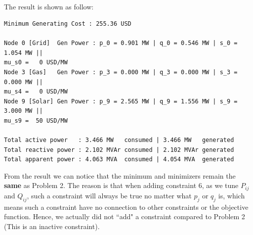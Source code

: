 \documentclass[12pt]{article}
\begin{document}
\subsection{}
The result is shown as follow:
\begin{verbatim}
Minimum Generating Cost : 255.36 USD

Node 0 [Grid]  Gen Power : p_0 = 0.901 MW | q_0 = 0.546 MW | s_0 = 1.054 MW || 
mu_s0 =   0 USD/MW
Node 3 [Gas]   Gen Power : p_3 = 0.000 MW | q_3 = 0.000 MW | s_3 = 0.000 MW || 
mu_s4 =   0 USD/MW
Node 9 [Solar] Gen Power : p_9 = 2.565 MW | q_9 = 1.556 MW | s_9 = 3.000 MW || 
mu_s9 =  50 USD/MW

Total active power   : 3.466 MW   consumed | 3.466 MW   generated
Total reactive power : 2.102 MVAr consumed | 2.102 MVAr generated
Total apparent power : 4.063 MVA  consumed | 4.054 MVA  generated
\end{verbatim}
\newpage
\noindent From the result we can notice that the minimum and minimizers remain the \textbf{same} as Problem 2. The reason is that when adding constraint 6, as we tune $P_{ij}$ and $Q_{ij}$, such a constraint will always be true no matter what $p_j$ or $q_j$ is, which means such a constraint have no connection to other constraints or the objective function. Hence, we actually did not ``add" a constraint compared to Problem 2 (This is an inactive constraint).
\end{document}
